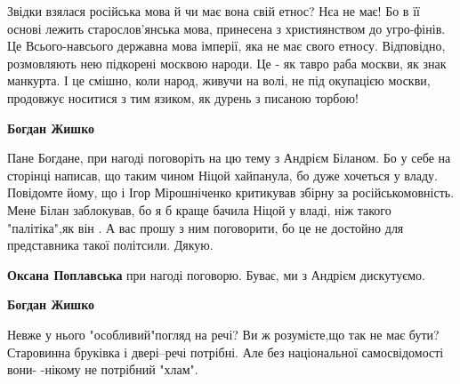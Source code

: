 \begin{itemize}
Звідки взялася російська мова й чи має вона свій етнос? Нєа не має! Бо в її
основі лежить старослов'янська мова, принесена з християнством до угро-фінів.
Це Всього-навсього державна мова імперії, яка не має свого етносу. Відповідно,
розмовляють нею підкорені москвою народи. Це - як тавро раба москви, як знак
манкурта. І це смішно, коли народ, живучи на волі, не під окупацією москви,
продовжує носитися з тим язиком, як дурень з писаною торбою!

\begin{itemize}
 
\textbf{Богдан Жишко} 

Пане Богдане, при нагоді поговоріть на цю тему з Андрієм Біланом. Бо у себе на
сторінці написав, що таким чином Ніцой хайпанула, бо дуже хочеться у владу.
Повідомте йому, що і Ігор Мірошніченко критикував збірну за російськомовність.
Мене Білан заблокував, бо я б краще бачила Ніцой у владі, ніж такого
"палітіка",як він . А вас прошу з ним поговорити, бо це не достойно для
представника такої політсили. Дякую.


 
\textbf{Оксана Поплавська} при нагоді поговорю. Буває, ми з Андрієм дискутуємо.

\begin{itemize}
 
\textbf{Богдан Жишко} 

Невже у нього "особливий"погляд на речі? Ви ж розумієте,що так не має бути?
Старовинна бруківка і двері--речі потрібні. Але без національної самосвідомості
вони- -нікому не потрібний "хлам".


 

\end{itemize}
\end{itemize}
\end{itemize}
